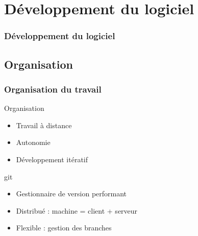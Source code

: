 \section{D\'eveloppement du logiciel}

\begin{frame}
 	\frametitle{Développement du logiciel}
\end{frame}

\subsection{Organisation}
\frame
{
\frametitle{Organisation du travail}
\begin{block}{Organisation}
 \begin{itemize}
 \item Travail à distance
 \item Autonomie
 \item Développement itératif
 \end{itemize}
\end{block}

\begin{block}{git}
\begin{itemize}
\item Gestionnaire de version performant
\item Distribué : machine = client + serveur
\item Flexible : gestion des branches
\end{itemize}
\end{block}

}

